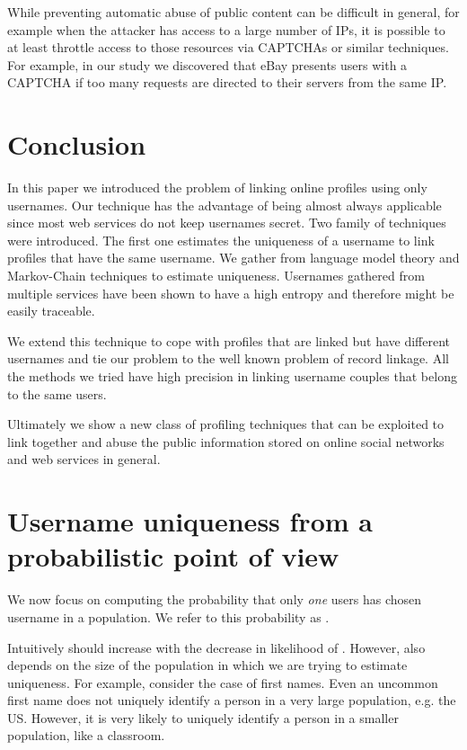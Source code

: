 \documentclass[letterpaper]{sig-alternate}
\begin{document}
While preventing automatic abuse of public content can be difficult in general, for example when the attacker has access to a large number of IPs, it
is possible to at least throttle access to those resources via CAPTCHAs \cite{captcha} or
similar techniques. For example, in our study we discovered that eBay presents
users with a CAPTCHA if too many requests are directed to their servers from the same IP.  




\section{Conclusion}

In this paper we introduced the problem of linking online profiles using
only usernames. Our technique has the advantage of being almost always
applicable since most web services do not keep usernames secret.
Two family of techniques were introduced. The first one estimates the
uniqueness of a username to link profiles that have the same username.  We
gather from language model theory and Markov-Chain techniques to estimate
uniqueness. 
Usernames gathered from multiple services have been shown to have a
high entropy and therefore might be easily traceable.



We extend this technique to cope with profiles that are linked but
have different usernames and tie our problem to the well known problem of
record linkage. All the methods we tried have high precision in linking
username couples that belong to the same users.

Ultimately we show a new class of profiling techniques that can be exploited
to link together and abuse the public information stored on online social
networks and web services in general.








\appendix
\section*{Username uniqueness from a probabilistic point of view}
\label{app:unique}
We now focus on computing the probability that only {\em one} users
has chosen username  in a population. We refer to this probability as . 



Intuitively  should increase with the decrease in likelihood of . However,
 also depends on the size of the population in which we are trying to estimate
uniqueness. For example, consider the case of first names. Even an uncommon first name
does not uniquely identify a person in a very large population, e.g. the US. However, it is very
likely to uniquely identify a person in a smaller population, like a classroom.  
\end{document}
